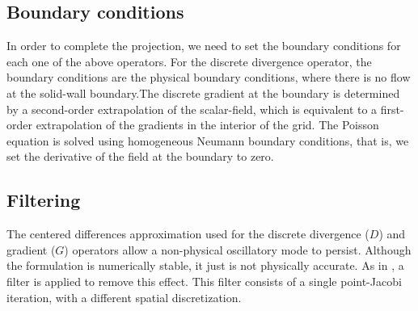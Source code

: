 \documentclass{article}
\begin{document}
\subsection{Boundary conditions}

In order to complete the projection, we need to set the boundary conditions for each one of the above operators. For the discrete divergence operator, the boundary conditions are the physical boundary conditions, where there is no flow at the solid-wall boundary.The discrete gradient at the boundary is determined by a second-order extrapolation of the scalar-field, which is equivalent to a first-order extrapolation of the gradients in the interior of the grid. The Poisson equation is solved using homogeneous Neumann boundary conditions, that is, we set the derivative of the field at the boundary to zero.


\subsection{Filtering}

The centered differences approximation used for the discrete divergence ($D$) and gradient ($G$) operators allow a non-physical oscillatory mode to persist. Although the formulation is numerically stable, it just is not physically accurate. As in \cite{Lai1993a}, a filter is applied to remove this effect. This filter consists of a single point-Jacobi iteration, with a different spatial discretization.
\end{document}
